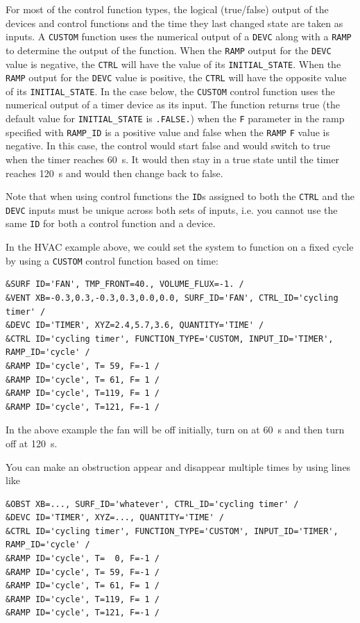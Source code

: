 \documentclass[11pt]{book}
\newcommand{\ct}{\tt\small}
\begin{document}
For most of the control function types, the logical (true/false) output of
the devices and control functions and the time they last changed
state are taken as inputs.  A {\ct CUSTOM} function uses the numerical output of a {\ct DEVC} along with
a {\ct RAMP} to determine the output of the function.  When the {\ct RAMP} output for the {\ct DEVC} value is negative, the
{\ct CTRL} will have the value of its {\ct INITIAL\_STATE}.  When the {\ct RAMP} output for the {\ct DEVC} value is positive, the
{\ct CTRL} will have the opposite value of its {\ct INITIAL\_STATE}. In the case below, the {\ct CUSTOM}
control function uses the numerical output of a timer device as its input.  The function returns true (the default value for
{\ct INITIAL\_STATE} is {\ct .FALSE.}) when the {\ct F} parameter
in the ramp specified with {\ct RAMP\_ID} is a positive value and
false when the {\ct RAMP} {\ct F} value is negative.
In this case, the control would start false and would switch to
true when the timer reaches 60~s.  It would then stay in a true
state until the timer reaches 120~s and would then change back to false.

\begin{warning}
Note that when using control functions the {\ct ID}s assigned to both the
{\ct CTRL} and the {\ct DEVC} inputs must be unique across both sets of inputs, i.e. you cannot use the
same {\ct ID} for both a control function and a device.
\end{warning}

\noindent
In the HVAC
example above, we could set the system to function
on a fixed cycle by using a {\ct CUSTOM} control function based on time:

\footnotesize
\begin{verbatim}
&SURF ID='FAN', TMP_FRONT=40., VOLUME_FLUX=-1. /
&VENT XB=-0.3,0.3,-0.3,0.3,0.0,0.0, SURF_ID='FAN', CTRL_ID='cycling timer' /
&DEVC ID='TIMER', XYZ=2.4,5.7,3.6, QUANTITY='TIME' /
&CTRL ID='cycling timer', FUNCTION_TYPE='CUSTOM, INPUT_ID='TIMER', RAMP_ID='cycle' /
&RAMP ID='cycle', T= 59, F=-1 /
&RAMP ID='cycle', T= 61, F= 1 /
&RAMP ID='cycle', T=119, F= 1 /
&RAMP ID='cycle', T=121, F=-1 /
\end{verbatim} \normalsize

\noindent
In the above example the fan will be off initially, turn on at 60~s and then turn off at 120~s.

You can make an obstruction appear and disappear multiple times by using lines like

\footnotesize
\begin{verbatim}
&OBST XB=..., SURF_ID='whatever', CTRL_ID='cycling timer' /
&DEVC ID='TIMER', XYZ=..., QUANTITY='TIME' /
&CTRL ID='cycling timer', FUNCTION_TYPE='CUSTOM', INPUT_ID='TIMER', RAMP_ID='cycle' /
&RAMP ID='cycle', T=  0, F=-1 /
&RAMP ID='cycle', T= 59, F=-1 /
&RAMP ID='cycle', T= 61, F= 1 /
&RAMP ID='cycle', T=119, F= 1 /
&RAMP ID='cycle', T=121, F=-1 /
\end{verbatim}
\end{document}
